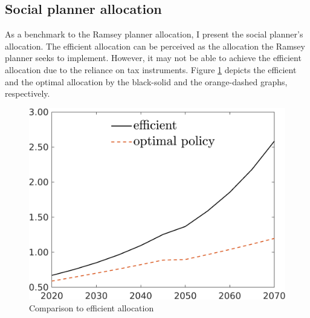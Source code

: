 \subsection{Social planner allocation}\label{subsec:sp_q}
As a benchmark to the Ramsey planner allocation, I present the social planner's allocation. The efficient allocation can be perceived as the allocation the Ramsey planner seeks to implement. However, it may not be able to achieve the efficient allocation due to the reliance on tax instruments. Figure \ref{fig:fb_opt} depicts the efficient and the optimal allocation by the black-solid and the orange-dashed graphs, respectively. 
\begin{figure}[h!!]
	\centering
	\caption{Comparison to efficient allocation }\label{fig:fb_opt}
	
	\begin{minipage}[]{0.32\textwidth}
		\includegraphics[width=1\textwidth]{../../codding_model/own_basedOnFried/optimalPol_190722_tidiedUp/figures/all_10Aout22/C_CompEffOPT_T_NoTaus_regime3_opteff_spillover0_noskill0_sep1_xgrowth0_countec0_etaa0.79_lgd1_lff0.png}
	\end{minipage}
	\begin{minipage}[]{0.32\textwidth}

\end{minipage}
\end{figure}
